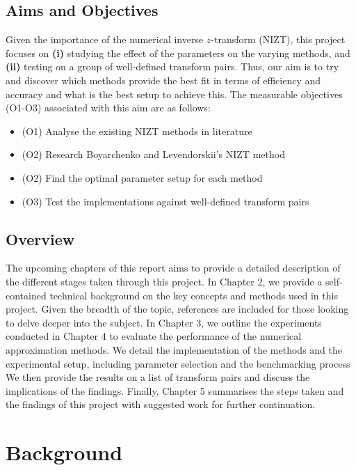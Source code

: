 \documentclass[a4paper]{report}
\begin{document}
\section{Aims and Objectives}
Given the importance of the numerical inverse $z$-transform (NIZT), this project focuses on \textbf{(i)} studying the effect of the parameters on the varying methods, and \textbf{(ii)} testing on a group of well-defined transform pairs. Thus, our aim is to try and discover which methods provide the best fit in terms of efficiency and accuracy and what is the best setup to achieve this. The measurable objectives (O1-O3) associated with this aim are as follows:

\begin{itemize}
	\item (O1) Analyse the existing NIZT methods in literature
	\item (O2) Research Boyarchenko and Levendorskii's NIZT method
	\item (O2) Find the optimal parameter setup for each method
	\item (O3) Test the implementations against well-defined transform pairs
\end{itemize}

\section{Overview}
The upcoming chapters of this report aims to provide a detailed description of the different stages taken through this project. In Chapter 2, we provide a self-contained technical background on the key concepts and methods used in this project. Given the breadth of the topic, references are included for those looking to delve deeper into the subject. In Chapter 3, we outline the experiments conducted in Chapter 4 to evaluate the performance of the numerical approximation methods. We detail the implementation of the methods and the experimental setup, including parameter selection and the benchmarking process We then provide the results on a list of transform pairs and discuss the implications of the findings. Finally, Chapter 5 summarises the steps taken and the findings of this project with suggested work for further continuation. 

\chapter{Background}
\end{document}
